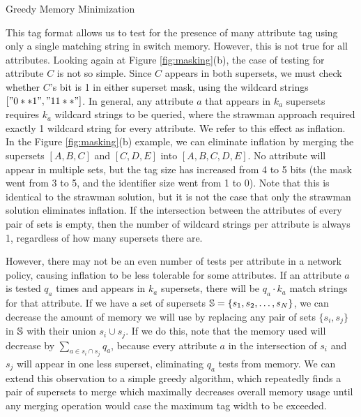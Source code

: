 \begin{algorithm}
\DontPrintSemicolon
{}
\caption{Greedy Memory Minimization\label{alg:memory_min}}
\end{algorithm}


This tag format allows us to test for the presence of many attribute tag using
only a single matching string in switch memory.  However, this is not true for
all attributes. Looking again at Figure \ref{fig:masking}(b), the case of
testing for attribute $C$ is not so simple. Since $C$ appears in both supersets,
we must check whether $C$'s bit is 1 in either superset mask, using the wildcard
strings $["0**1", "11**"]$. In general, any attribute $a$ that appears in $k_a$ supersets
requires $k_a$ wildcard strings to be queried, where the strawman approach
required exactly 1 wildcard string for every attribute. We refer to this effect as inflation. In the Figure
\ref{fig:masking}(b) example, we can eliminate inflation by merging the
supersets $[A,B,C]$ and $[C,D,E]$ into $[A,B,C,D,E]$. No attribute will appear
in multiple sets, but the tag size has increased from 4 to 5 bits (the mask went
from 3 to 5, and the identifier size went from 1 to 0). Note that this is identical to the strawman solution, but it is not the case that only the strawman solution eliminates inflation. If the intersection between the attributes of every pair of sets is empty, then the number of wildcard strings per attribute is always 1, regardless of how many supersets there are. 

However, there may not be an even number of tests per attribute in a network policy, causing inflation
to be less tolerable for some attributes. 
If an attribute $a$ is tested $q_a$ times and appears in $k_a$
supersets, there will be $q_a\cdot k_a$ match strings for that
attribute. If we have a set of supersets $\mathbb{S} = \{s_1, s_2, \dots, s_N\}$, we
can decrease the amount of memory we will use by replacing any pair
of sets $\{s_i, s_j\}$ in $\mathbb{S}$ with their union $s_i\cup s_j$. If we do this,
note that the memory used will decrease by $\sum_{a \in s_i\cap s_j}q_a$,
because every attribute $a$ in the intersection of $s_i$ and $s_j$ will appear
in one less superset, eliminating $q_a$ tests from memory. We can extend this
observation to a simple greedy algorithm, which repeatedly finds a pair of
supersets to merge which maximally decreases overall memory usage until any
merging operation would case the maximum tag width to be exceeded. 


